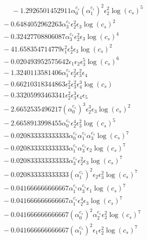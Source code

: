 \documentclass[10pt]{article}
\begin{document}
\begin{align*}
\phantom{F_{s,7}} &\phantom{={}}{}  - 1.2926501452911 \alpha_{0}^{c_s} \left(\alpha_{1}^{c_s}\right)^{2} \epsilon_{2}^{2} \log{\left(c_{s} \right)}^{5} \\
&{}  - 0.6484052962263 \alpha_{3}^{c_s} \epsilon_{2}^{2} \epsilon_{3} \log{\left(c_{s} \right)}^{2} \\
&{}  - 0.32427708806087 \alpha_{3}^{c_s} \epsilon_{2}^{2} \epsilon_{3} \log{\left(c_{s} \right)}^{4} \\
&{}  - 41.658354714779 \epsilon_{1}^{2} \epsilon_{2}^{4} \epsilon_{3} \log{\left(c_{s} \right)}^{2} \\
&{}  - 0.020493952575642 \epsilon_{1} \epsilon_{2} \epsilon_{3}^{5} \log{\left(c_{s} \right)}^{6} \\
&{}  - 1.3240113581406 \alpha_{1}^{c_s} \epsilon_{2}^{2} \epsilon_{3}^{2} \epsilon_{4} \\
&{}  - 0.66210318344863 \epsilon_{2}^{2} \epsilon_{3}^{2} \epsilon_{4}^{3} \log{\left(c_{s} \right)} \\
&{}  - 0.33205993463341 \epsilon_{2}^{2} \epsilon_{3}^{3} \epsilon_{4} \epsilon_{5} \\
&{}  - 2.6652535496217 \left(\alpha_{0}^{c_s}\right)^{3} \epsilon_{2}^{3} \epsilon_{3} \log{\left(c_{s} \right)}^{2} \\
&{}  - 2.6658913998455 \alpha_{0}^{c_s} \epsilon_{2}^{4} \epsilon_{3}^{2} \log{\left(c_{s} \right)}^{5} \\
&{}  - 0.020833333333333 \alpha_{0}^{c_s} \alpha_{1}^{c_s} \alpha_{3}^{c_s} \log{\left(c_{s} \right)}^{7} \\
&{}  - 0.020833333333333 \alpha_{1}^{c_s} \alpha_{3}^{c_s} \epsilon_{2} \log{\left(c_{s} \right)}^{7} \\
&{}  - 0.020833333333333 \alpha_{3}^{c_s} \epsilon_{2}^{2} \epsilon_{3} \log{\left(c_{s} \right)}^{7} \\
&{}  - 0.020833333333333 \left(\alpha_{1}^{c_s}\right)^{2} \epsilon_{2} \epsilon_{3}^{2} \log{\left(c_{s} \right)}^{7} \\
&{}  - 0.041666666666667 \alpha_{1}^{c_s} \alpha_{3}^{c_s} \epsilon_{1} \log{\left(c_{s} \right)}^{7} \\
&{}  - 0.041666666666667 \alpha_{1}^{c_s} \epsilon_{2}^{4} \epsilon_{3} \log{\left(c_{s} \right)}^{7} \\
&{}  - 0.041666666666667 \left(\alpha_{0}^{c_s}\right)^{2} \alpha_{2}^{c_s} \epsilon_{2}^{2} \log{\left(c_{s} \right)}^{7} \\
&{}  - 0.041666666666667 \left(\alpha_{1}^{c_s}\right)^{2} \epsilon_{1} \epsilon_{2}^{2} \log{\left(c_{s} \right)}^{7} \\

\end{align*}
\end{document}
